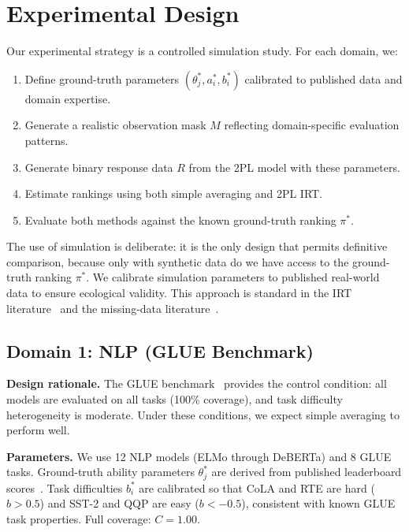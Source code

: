 \documentclass[11pt,a4paper]{article}
\begin{document}
\section{Experimental Design}

Our experimental strategy is a controlled simulation study. For each domain, we:
\begin{enumerate}
\item Define ground-truth parameters $(\theta^*_j, a^*_i, b^*_i)$ calibrated to published data and domain expertise.
\item Generate a realistic observation mask $M$ reflecting domain-specific evaluation patterns.
\item Generate binary response data $R$ from the 2PL model with these parameters.
\item Estimate rankings using both simple averaging and 2PL IRT.
\item Evaluate both methods against the known ground-truth ranking $\pi^*$.
\end{enumerate}

The use of simulation is deliberate: it is the only design that permits definitive comparison, because only with synthetic data do we have access to the ground-truth ranking $\pi^*$. We calibrate simulation parameters to published real-world data to ensure ecological validity. This approach is standard in the IRT literature~\cite{deayala2009,embretson2000} and the missing-data literature~\cite{rubin1976}.

\subsection{Domain 1: NLP (GLUE Benchmark)}

\textbf{Design rationale.} The GLUE benchmark~\cite{wang2018} provides the control condition: all models are evaluated on all tasks (100\% coverage), and task difficulty heterogeneity is moderate. Under these conditions, we expect simple averaging to perform well.

\textbf{Parameters.} We use 12 NLP models (ELMo through DeBERTa) and 8 GLUE tasks. Ground-truth ability parameters $\theta^*_j$ are derived from published leaderboard scores~\cite{devlin2019,liu2019roberta,raffel2020,he2021}. Task difficulties $b^*_i$ are calibrated so that CoLA and RTE are hard ($b > 0.5$) and SST-2 and QQP are easy ($b < -0.5$), consistent with known GLUE task properties. Full coverage: $C = 1.00$.
\end{document}
